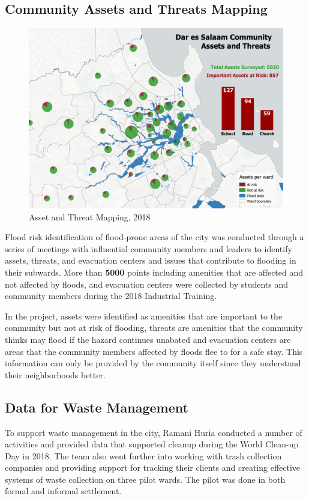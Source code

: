 \documentclass[a4paper,12pt,twoside]{article}
\begin{document}
\newpage
\subsection{Community Assets and Threats Mapping}
\begin{figure}[h]
    \centering
    \includegraphics[width=.8\textwidth]{images/asset_pie_min.png}
    \caption{Asset and Threat Mapping, 2018}
    \label{fig:my_label}
\end{figure}

\begin{multicols}{2}
Flood risk identification of flood-prone areas of the city was conducted through a series of meetings with influential community members and leaders to identify assets, threats, and evacuation centers and issues that contribute to flooding in their subwards. More than \textbf{5000} points including amenities that are affected and not affected by floods, and evacuation centers were collected by students and community members during the 2018 Industrial Training.

In the project, assets were identified as amenities that are important to the community but not at risk of flooding, threats are amenities that the community thinks may flood if the hazard continues unabated and evacuation centers are areas that the community members affected by floods flee to for a safe stay. This information can only be provided by the community itself since they understand their neighborhoods better.
\end{multicols}

\newpage
\subsection{Data for Waste Management}
\begin{multicols}{2}
To support waste management in the city, Ramani Huria conducted a number of activities and provided data that supported cleanup during the World Clean-up Day in 2018. The team also went further into working with trash collection companies and providing support for tracking their clients and creating effective systems of waste collection on three pilot wards. The pilot was done in both formal and informal settlement.
\end{multicols}
\end{document}
